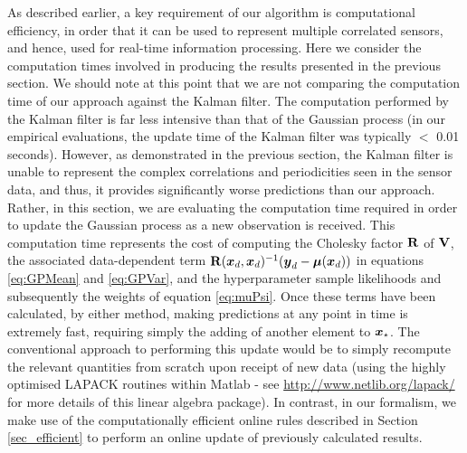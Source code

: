 \documentclass{acmsmall}
\begin{document}
\noindent As described earlier, a key requirement of our algorithm is computational efficiency, in order that it can be used to represent multiple correlated sensors, and hence, used for real-time information processing. Here we consider the computation times involved in producing the results presented in the previous section. We should note at this point that we are not comparing the computation time of our approach against the Kalman filter. The computation performed by the Kalman filter is far less intensive than that of the Gaussian process (in our empirical evaluations, the update time of the Kalman filter was typically $<$ 0.01 seconds). However, as demonstrated in the previous section, the Kalman filter is unable to represent the complex correlations and periodicities seen in the sensor data, and thus, it provides significantly worse predictions than our approach. Rather, in this section, we are evaluating the computation time required in order to update the Gaussian process as a new observation is received. This computation time represents the cost of computing the Cholesky factor $\mathbf{R}$ of $\mathbf{V}$, the associated data-dependent term $\mathbf{R}(\boldsymbol{x}_d,\boldsymbol{x}_d)^{-1}(\boldsymbol{y}_d-\boldsymbol{\mu}(\boldsymbol{x}_d))$ in equations \eqref{eq:GPMean} and \eqref{eq:GPVar}, and the hyperparameter sample likelihoods and subsequently the weights of equation \eqref{eq:muPsi}. Once these terms have been calculated, by either method, making predictions at any point in time is extremely fast, requiring simply the adding of another element to $\boldsymbol{x}_\star$. The conventional approach to performing this update would be to simply recompute the relevant quantities from scratch upon receipt of new data (using the highly optimised LAPACK routines within Matlab - see \url{http://www.netlib.org/lapack/} for more details of this linear algebra package). In contrast, in our formalism, we make use of the computationally efficient online rules described in Section \ref{sec_efficient} to perform an online update of previously calculated results.  
\end{document}
